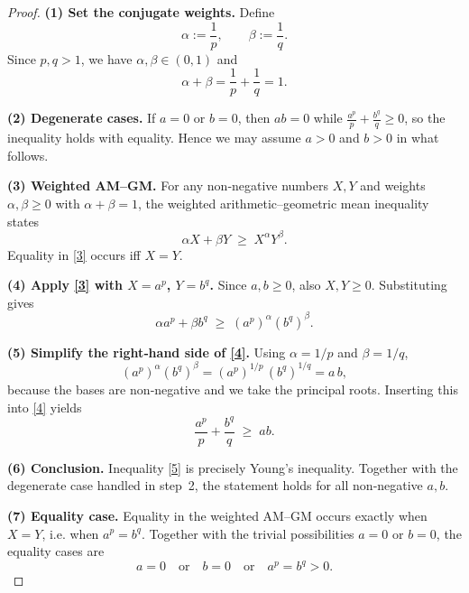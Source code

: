 \begin{proof}
\textbf{(1) Set the conjugate weights.}  
Define
\[
\alpha:=\frac{1}{p},\qquad \beta:=\frac{1}{q}.
\]
Since $p,q>1$, we have $\alpha,\beta\in(0,1)$ and
\[
\alpha+\beta=\frac{1}{p}+\frac{1}{q}=1 .
\]

\medskip

\textbf{(2) Degenerate cases.}  
If $a=0$ or $b=0$, then $ab=0$ while $\frac{a^{p}}{p}+\frac{b^{q}}{q}\ge0$, so the inequality holds with equality. Hence we may assume $a>0$ and $b>0$ in what follows.

\medskip

\textbf{(3) Weighted AM–GM.}  
For any non‑negative numbers $X,Y$ and weights $\alpha,\beta\ge0$ with $\alpha+\beta=1$, the weighted arithmetic–geometric mean inequality states
\[
\alpha X+\beta Y\;\ge\;X^{\alpha}Y^{\beta}.
\tag{3}
\]
Equality in \eqref{3} occurs iff $X=Y$.

\medskip

\textbf{(4) Apply \eqref{3} with $X=a^{p}$, $Y=b^{q}$.}  
Since $a,b\ge0$, also $X,Y\ge0$. Substituting gives
\[
\alpha a^{p}+\beta b^{q}\;\ge\;(a^{p})^{\alpha}(b^{q})^{\beta}.
\tag{4}
\]

\medskip

\textbf{(5) Simplify the right‑hand side of \eqref{4}.}  
Using $\alpha=1/p$ and $\beta=1/q$,
\[
(a^{p})^{\alpha}(b^{q})^{\beta}
= (a^{p})^{1/p}\,(b^{q})^{1/q}
= a\,b ,
\]
because the bases are non‑negative and we take the principal roots.  Inserting this into \eqref{4} yields
\[
\frac{a^{p}}{p}+\frac{b^{q}}{q}\;\ge\;ab .
\tag{5}
\]

\medskip

\textbf{(6) Conclusion.}  
Inequality \eqref{5} is precisely Young’s inequality. Together with the degenerate case handled in step~2, the statement holds for all non‑negative $a,b$.

\medskip

\textbf{(7) Equality case.}  
Equality in the weighted AM–GM occurs exactly when $X=Y$, i.e. when $a^{p}=b^{q}$. Together with the trivial possibilities $a=0$ or $b=0$, the equality cases are
\[
a=0\quad\text{or}\quad b=0\quad\text{or}\quad a^{p}=b^{q}>0 .
\]
\end{proof}